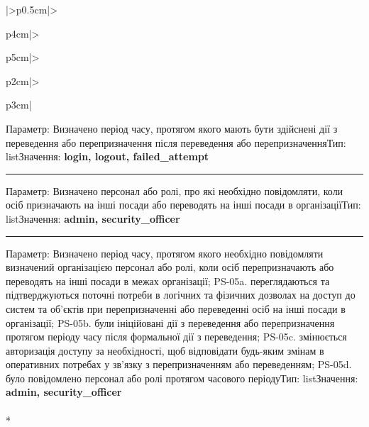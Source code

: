\documentclass[10pt]{article}
\begin{document}
\begin{longtable}{|>{\centering\arraybackslash}p{0.5cm}|>{\raggedright\arraybackslash}p{4cm}|>{\raggedright\arraybackslash}p{5cm}|>{\raggedright\arraybackslash}p{2cm}|>{\raggedright\arraybackslash}p{3cm}|}
Параметр: Визначено період часу, протягом якого мають бути здійснені дії з переведення або перепризначення після переведення або перепризначення\newline Тип: list\newline Значення: \textbf{login, logout, failed\_\allowbreak{}attempt}\vspace{1mm}\newline\noindent\rule{\linewidth}{0.4pt}\vspace{1mm}
Параметр: Визначено персонал або ролі, про які необхідно повідомляти, коли осіб призначають на інші посади або переводять на інші посади в організації\newline Тип: list\newline Значення: \textbf{admin, security\_\allowbreak{}officer}\vspace{1mm}\newline\noindent\rule{\linewidth}{0.4pt}\vspace{1mm}
Параметр: Визначено період часу, протягом якого необхідно повідомляти визначений організацією персонал або ролі, коли осіб перепризначають або переводять на інші посади в межах організації; PS-05a. переглядаються та підтверджуються поточні потреби в логічних та фізичних дозволах на доступ до систем та об'єктів при перепризначенні або переведенні осіб на інші посади в організації; PS-05b. були ініційовані дії з переведення або перепризначення протягом періоду часу після формальної дії з переведення; PS-05c. змінюється авторизація доступу за необхідності, щоб відповідати будь-яким змінам в оперативних потребах у зв'язку з перепризначенням або переведенням; PS-05d. було повідомлено персонал або ролі протягом часового періоду\newline Тип: list\newline Значення: \textbf{admin, security\_\allowbreak{}officer} \\ \hline
{} \\* 

\end{longtable}
\end{document}
